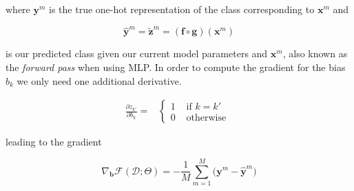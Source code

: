 \noindent where $\mathbf{y}^m$ is the true one-hot representation of the class
corresponding to $\mathbf{x}^m$ and 

\begin{equation}
\hat{\mathbf{y}}^m = \tilde{\mathbf{z}}^m =  (\mathbf{f} \circ \mathbf{g})(\mathbf{x}^m)
\label{eq:forwardPass}
\end{equation}

\noindent is our predicted class given our current model parameters and
$\mathbf{x}^m$, also known as the \textit{forward pass} when using MLP. In
order to compute the gradient for the bias $b_{k}$  we only need one additional
derivative.

\begin{align}
\frac{\partial z_{k'}}{\partial b_{k}} = 
  &\begin{cases}
      1  &  \mbox{ if } k = k'\\ 
      0  &  \mbox{ otherwise } 
  \end{cases} 
  \label{eqn:eqsilonq}
\end{align}
	
\noindent leading to the gradient

\begin{equation}
\nabla_\mathbf{b}\mathcal{F}(\mathcal{D};\Theta) = -\frac{1}{M}\sum_{m=1}^M \Big(\mathbf{y}^m - \hat{\mathbf{y}}^m \Big)   
\label{eq:gradBias}
\end{equation}

